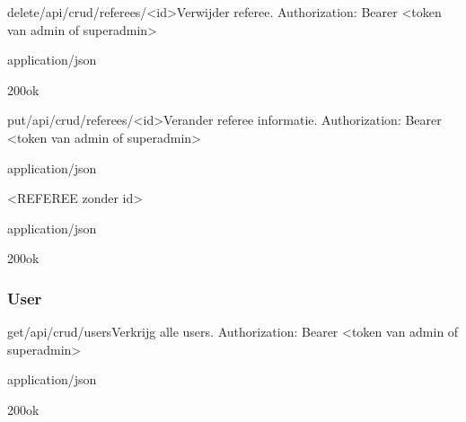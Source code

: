 \documentclass[10pt]{article}
\begin{document}
\begin{apiRoute}{delete}{/api/crud/referees/<id>}{Verwijder referee.}
 Authorization: Bearer <token van admin of superadmin>
	\begin{routeParameter}
	\end{routeParameter}

	\begin{routeResponse}{application/json}
		\begin{routeResponseItem}{200}{ok}
			\begin{routeResponseItemBody}
			\end{routeResponseItemBody}
		\end{routeResponseItem}
	\end{routeResponse}
\end{apiRoute}

\begin{apiRoute}{put}{/api/crud/referees/<id>}{Verander referee informatie.}
 Authorization: Bearer <token van admin of superadmin>
	\begin{routeParameter}
		\routeParamItem{id}{match id}
	\end{routeParameter}

	\begin{routeRequest}{application/json}
		\begin{routeRequestBody}
<REFEREE zonder id>
		\end{routeRequestBody}
	\end{routeRequest}

	\begin{routeResponse}{application/json}
		\begin{routeResponseItem}{200}{ok}
			\begin{routeResponseItemBody}
			\end{routeResponseItemBody}
		\end{routeResponseItem}
	\end{routeResponse}
\end{apiRoute}

\subsubsection{User}

\begin{apiRoute}{get}{/api/crud/users}{Verkrijg alle users.}
 Authorization: Bearer <token van admin of superadmin>
	\begin{routeResponse}{application/json}
		\begin{routeResponseItem}{200}{ok}
			\begin{routeResponseItemBody}
[
	<USER>, ...
]
\end{routeResponseItemBody}
		\end{routeResponseItem}
	\end{routeResponse}
\end{apiRoute}
\end{document}
